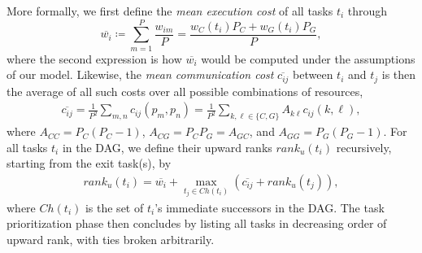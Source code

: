 \documentclass[runningheads]{llncs}
\begin{document}
More formally, we first define the {\em mean execution cost} of all tasks $t_i$ through
\begin{equation}
\label{eq.avg_comp}
\overline{w_i} \coloneqq \sum_{m = 1}^{P} \frac{w_{im}}{P} = \frac{w_C(t_i) P_C + w_G(t_i) P_G}{P},
\end{equation}  
where the second expression is how $\overline{w_i}$ would be computed under the assumptions of our model. Likewise, the {\em mean communication cost} $\overline{c_{ij}}$ between $t_i$ and $t_j$ is then the average of all such costs over all possible combinations of resources,
\begin{align}
\label{eq.avg_comm}
\overline{c_{ij}} = \frac{1}{P^2}\sum_{m, n} c_{ij}(p_m, p_n) = \frac{1}{P^2}\sum_{k, \ell \in \{ C, G \}} A_{k\ell} c_{ij}(k, \ell),
\end{align}
where $A_{CC} = P_C(P_C - 1)$, $A_{CG} = P_C P_G = A_{GC}$, and $A_{GG} = P_G(P_G - 1)$. 
For all tasks $t_i$ in the DAG, we define their upward ranks $rank_u(t_i)$ recursively, starting from the exit task(s), by
\begin{align}
\label{eq.upward_rank}
rank_u(t_i) = \overline{w_i} + \max_{t_j \in Ch(t_i)} (\overline{c_{ij}} + rank_u(t_j)),
\end{align}
where $Ch(t_i)$ is the set of $t_i$'s immediate successors in the DAG. The task prioritization phase then concludes by listing all tasks in decreasing order of upward rank, with ties broken arbitrarily. 
\end{document}
